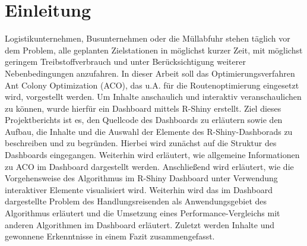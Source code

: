 \section{Einleitung}\label{chap:Einleitung}

Logistikunternehmen, Busunternehmen oder die Müllabfuhr stehen täglich vor dem Problem, alle geplanten Zielstationen in möglichst kurzer Zeit, mit möglichst geringem Treibstoffverbrauch und unter Berücksichtigung weiterer Nebenbedingungen anzufahren.\newline     
In dieser Arbeit soll das Optimierungsverfahren Ant Colony Optimization (ACO), das u.A. für die Routenoptimierung eingesetzt wird, vorgestellt werden. \newline
Um Inhalte anschaulich und interaktiv veranschaulichen zu können, wurde hierfür ein Dashboard mittels R-Shiny erstellt. \newline
Ziel dieses Projektberichts ist es, den Quellcode des Dashboards zu erläutern sowie den Aufbau, die Inhalte und die Auswahl der Elemente des R-Shiny-Dashborads zu beschreiben und zu begründen. \newline
Hierbei wird zunächst auf die Struktur des Dashboards eingegangen. Weiterhin wird erläutert, wie allgemeine Informationen zu ACO im Dashboard dargestellt werden. Anschließend wird erläutert, wie die Vorgehensweise des Algorithmus  im R-Shiny Dashboard unter Verwendung interaktiver Elemente visualisiert wird. Weiterhin wird das im Dashboard dargestellte Problem des Handlungsreisenden als Anwendungsgebiet des Algorithmus erläutert und die Umsetzung eines Performance-Vergleichs mit anderen Algorithmen im Dashboard erläutert. 
Zuletzt werden Inhalte und gewonnene Erkenntnisse in einem Fazit zusammengefasst. 